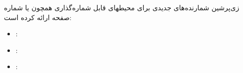\begin{plainslide}%
%
زی‌پرشین  شمارنده‌های جدیدی برای محیطهای قابل شماره‌گذاری همچون  یا شماره صفحه ارائه کرده است:
\begin{latin}
\begin{itemize}
\item {}: 
\item {}: 
\item {}: 
\end{itemize}
\end{latin}

\end{plainslide}
